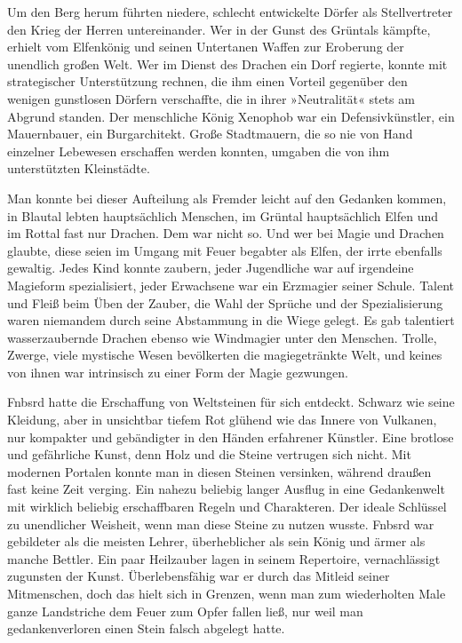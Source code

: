 Um den Berg herum führten niedere, schlecht entwickelte Dörfer als Stellvertreter den Krieg der Herren untereinander. Wer in der Gunst des Grüntals kämpfte, erhielt vom Elfenkönig und seinen Untertanen Waffen zur Eroberung der unendlich großen Welt. Wer im Dienst des Drachen ein Dorf regierte, konnte mit strategischer Unterstützung rechnen, die ihm einen Vorteil gegenüber den wenigen gunstlosen Dörfern verschaffte, die in ihrer »Neutralität« stets am Abgrund standen. Der menschliche König Xenophob war ein Defensivkünstler, ein Mauernbauer, ein Burgarchitekt. Große Stadtmauern, die so nie von Hand einzelner Lebewesen erschaffen werden konnten, umgaben die von ihm unterstützten Kleinstädte.

Man konnte bei dieser Aufteilung als Fremder leicht auf den Gedanken kommen, in Blautal lebten hauptsächlich Menschen, im Grüntal hauptsächlich Elfen und im Rottal fast nur Drachen. Dem war nicht so. Und wer bei Magie und Drachen glaubte, diese seien im Umgang mit Feuer begabter als Elfen, der irrte ebenfalls gewaltig. Jedes Kind konnte zaubern, jeder Jugendliche war auf irgendeine Magieform spezialisiert, jeder Erwachsene war ein Erzmagier seiner Schule. Talent und Fleiß beim Üben der Zauber, die Wahl der Sprüche und der Spezialisierung waren niemandem durch seine Abstammung in die Wiege gelegt. Es gab talentiert wasserzaubernde Drachen ebenso wie Windmagier unter den Menschen. Trolle, Zwerge, viele mystische Wesen bevölkerten die magiegetränkte Welt, und keines von ihnen war intrinsisch zu einer Form der Magie gezwungen.

Fnbsrd hatte die Erschaffung von Weltsteinen für sich entdeckt. Schwarz wie seine Kleidung, aber in unsichtbar tiefem Rot glühend wie das Innere von Vulkanen, nur kompakter und gebändigter in den Händen erfahrener Künstler. Eine brotlose und gefährliche Kunst, denn Holz und die Steine vertrugen sich nicht. Mit modernen Portalen konnte man in diesen Steinen versinken, während draußen fast keine Zeit verging. Ein nahezu beliebig langer Ausflug in eine Gedankenwelt mit wirklich beliebig erschaffbaren Regeln und Charakteren. Der ideale Schlüssel zu unendlicher Weisheit, wenn man diese Steine zu nutzen wusste. Fnbsrd war gebildeter als die meisten Lehrer, überheblicher als sein König und ärmer als manche Bettler. Ein paar Heilzauber lagen in seinem Repertoire, vernachlässigt zugunsten der Kunst. Überlebensfähig war er durch das Mitleid seiner Mitmenschen, doch das hielt sich in Grenzen, wenn man zum wiederholten Male ganze Landstriche dem Feuer zum Opfer fallen ließ, nur weil man gedankenverloren einen Stein falsch abgelegt hatte.

